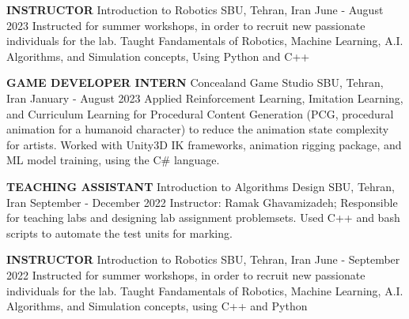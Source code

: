 \begin{cventries}
    \cventry
    {\textbf{INSTRUCTOR}}
    {Introduction to Robotics}
    {SBU, Tehran, Iran}
    {June - August 2023}
    {Instructed for summer workshops, in order to recruit new passionate individuals for the lab.
    \newline Taught Fandamentals of Robotics, Machine Learning, A.I. Algorithms, and Simulation concepts, Using Python and C++}
    \vspace{0.4 cm}
\end{cventries}

\begin{cventries}
    \cventry
    {\textbf{GAME DEVELOPER INTERN}}
    {Concealand Game Studio}
    {SBU, Tehran, Iran}
    {January - August 2023}
    {Applied Reinforcement Learning, Imitation Learning, and Curriculum Learning for Procedural Content Generation (PCG, procedural animation for a humanoid character) to reduce the animation state complexity for artists. 
    \newline Worked with Unity3D IK frameworks, animation rigging package, and ML model training, using the C\# language.}
\end{cventries}
\begin{cventries}
    \cventry
    {\textbf{TEACHING ASSISTANT}}
    {Introduction to Algorithms Design}
    {SBU, Tehran, Iran}
    {September - December 2022}
    {Instructor: Ramak Ghavamizadeh; Responsible for teaching labs and designing lab assignment problemsets.
    \newline Used C++ and bash scripts to automate the test units for marking.}
    \vspace{0.4 cm}
\end{cventries}

\begin{cventries}
    \cventry
    {\textbf{INSTRUCTOR}}
    {Introduction to Robotics}
    {SBU, Tehran, Iran}
    {June - September 2022}
    {Instructed for summer workshops, in order to recruit new passionate individuals for the lab.
    \newline Taught Fandamentals of Robotics, Machine Learning, A.I. Algorithms, and Simulation concepts, using C++ and Python}
    \vspace{0.4 cm}
\end{cventries}

